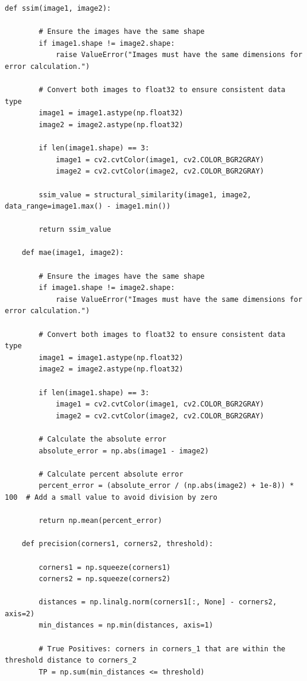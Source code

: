 \documentclass[11pt, conference, letterpaper]{IEEEtran}
\begin{document}
\begin{lstlisting}[style=python, caption={\texttt{utils.py}}, label={lst:utils}]
    def ssim(image1, image2):
        
        # Ensure the images have the same shape
        if image1.shape != image2.shape:
            raise ValueError("Images must have the same dimensions for error calculation.")
    
        # Convert both images to float32 to ensure consistent data type
        image1 = image1.astype(np.float32)
        image2 = image2.astype(np.float32)
        
        if len(image1.shape) == 3:
            image1 = cv2.cvtColor(image1, cv2.COLOR_BGR2GRAY)
            image2 = cv2.cvtColor(image2, cv2.COLOR_BGR2GRAY)
        
        ssim_value = structural_similarity(image1, image2, data_range=image1.max() - image1.min())
    
        return ssim_value
    
    def mae(image1, image2):
        
        # Ensure the images have the same shape
        if image1.shape != image2.shape:
            raise ValueError("Images must have the same dimensions for error calculation.")
    
        # Convert both images to float32 to ensure consistent data type
        image1 = image1.astype(np.float32)
        image2 = image2.astype(np.float32)
        
        if len(image1.shape) == 3:
            image1 = cv2.cvtColor(image1, cv2.COLOR_BGR2GRAY)
            image2 = cv2.cvtColor(image2, cv2.COLOR_BGR2GRAY)
    
        # Calculate the absolute error
        absolute_error = np.abs(image1 - image2)
    
        # Calculate percent absolute error
        percent_error = (absolute_error / (np.abs(image2) + 1e-8)) * 100  # Add a small value to avoid division by zero
        
        return np.mean(percent_error)
    
    def precision(corners1, corners2, threshold):
        
        corners1 = np.squeeze(corners1)
        corners2 = np.squeeze(corners2) 
        
        distances = np.linalg.norm(corners1[:, None] - corners2, axis=2)
        min_distances = np.min(distances, axis=1)
        
        # True Positives: corners in corners_1 that are within the threshold distance to corners_2
        TP = np.sum(min_distances <= threshold)
        

\end{lstlisting}
\end{document}
